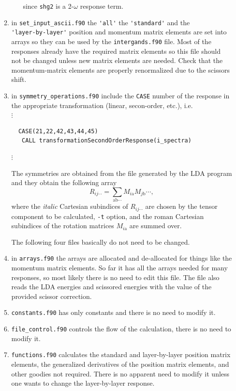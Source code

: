 \documentclass[openany,oneside]{book}
\numberwithin{equation}{section}
\begin{document}
\begin{itemize}
\begin{enumerate}
\begin{itemize}
since \verb=shg2= is a 2-$\omega$ response term.
\end{itemize} 

\item in \verb=set_input_ascii.f90=
 the \verb='all'= the \verb='standard'= and the \\\verb='layer-by-layer'=
position and momentum matrix elements are set into arrays so they can be used by the 
\verb=intergands.f90= file. Most of the responses already have the required
matrix elements so this file should not be changed unless new matrix
elements are needed. Check that the momentum-matrix elements are
properly renormalized due to the scissors shift. 

\item in \verb=symmetry_operations.f90= include the \verb=CASE= number
  of the response in the appropriate transformation (linear,
  secon-order, etc.), i.e.\\
$\vdots$
\begin{verbatim}
  CASE(21,22,42,43,44,45)
   CALL transformationSecondOrderResponse(i_spectra)
\end{verbatim} 
$\vdots$

The symmetries are obtained from the file generated by the LDA program
and they obtain the following array
\begin{equation}\label{uno}
R_{ij\cdots}=\sum_{\mathrm{ab}\cdots}M_{i\mathrm{a}} M_{j\mathrm{b}}\cdots
,
\end{equation}
where the {\it italic} Cartesian subindices of $R_{ij\cdots}$ are chosen by the
tensor component to be calculated, \verb=-t= option, 
and the $\mathrm{roman}$
Cartesian subindices of the rotation matrices $M_{i\mathrm{a}}$ are
summed over.

The following four files basically do not need to be changed.
\item in \verb=arrays.f90= the arrays are allocated and de-allocated
  for things like the momentum matrix elements. So far it has all the
  arrays needed for many responses, so most likely there is no need to
  edit this file. The file also reads the LDA energies and scissored
  energies with the value of the provided scissor correction.

\item \verb=constants.f90= has only constants and there is no need to
modify it.
\item \verb=file_control.f90= controls the flow of the calculation,
there is no need to
modify it.
\item \verb=functions.f90= calculates the standard and  layer-by-layer position
  matrix elements, the generalized derivatives of the position matrix
  elements, and other goodies not required. 
There is no apparent need to
modify it unless one wants to change the layer-by-layer response.


\end{enumerate}
\end{itemize}
\end{document}
